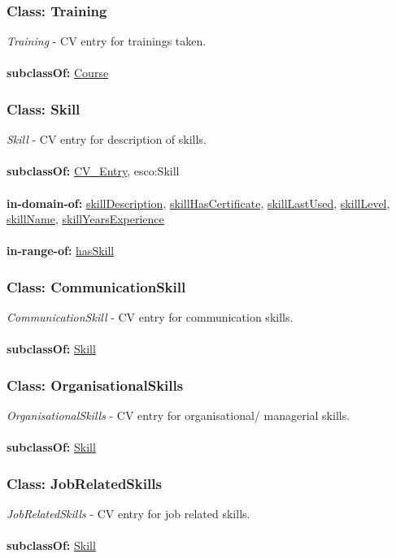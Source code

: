 \documentclass[a4paper,12pt]{article}
\numberwithin{equation}{section}
\begin{document}
\subsubsection{Class: Training}\hypertarget{Training}{}
\textit{Training} - CV entry for trainings taken.
\\\\
\textbf{subclassOf:} \hyperlink{Course}{Course}

\subsubsection{Class: Skill}\hypertarget{Skill}{}
\textit{Skill} - CV entry for description of skills.
\\\\
\textbf{subclassOf:} \hyperlink{CV\_Entry}{CV\_Entry}, esco:Skill
\\\\
\textbf{in-domain-of:} \hyperlink{skillDescription}{skillDescription}, \hyperlink{skillHasCertificate}{skillHasCertificate}, \hyperlink{skillLastUsed}{skillLastUsed}, \hyperlink{skillLevel}{skillLevel}, \hyperlink{skillName}{skillName}, \hyperlink{skillYearsExperience}{skillYearsExperience}
\\\\
\textbf{in-range-of:} \hyperlink{hasSkill}{hasSkill}

\subsubsection{Class: CommunicationSkill}\hypertarget{CommunicationSkill}{}
\textit{CommunicationSkill} - CV entry for communication skills.
\\\\
\textbf{subclassOf:} \hyperlink{Skill}{Skill}

\subsubsection{Class: OrganisationalSkills}\hypertarget{OrganisationalSkills}{}
\textit{OrganisationalSkills} - CV entry for organisational/ managerial skills.
\\\\
\textbf{subclassOf:} \hyperlink{Skill}{Skill}

\subsubsection{Class: JobRelatedSkills}\hypertarget{JobRelatedSkills}{}
\textit{JobRelatedSkills} - CV entry for job related skills.
\\\\
\textbf{subclassOf:} \hyperlink{Skill}{Skill}
\end{document}
